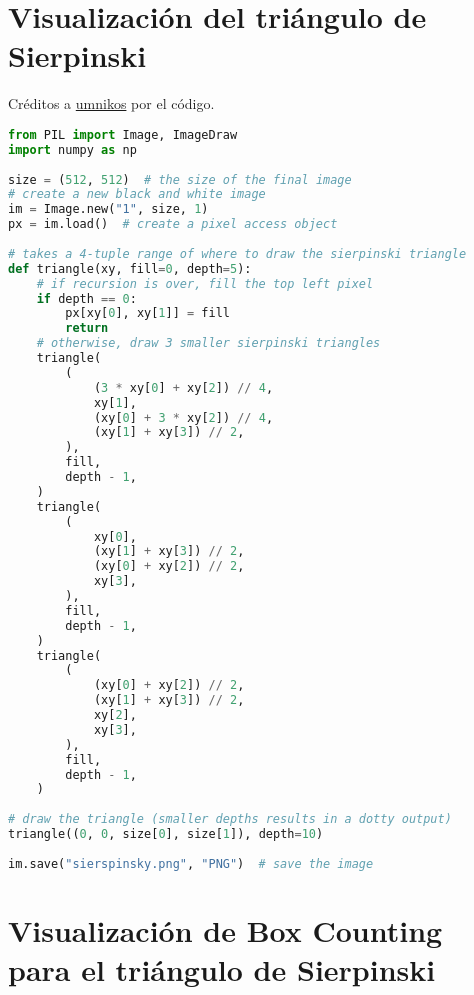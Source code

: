 \section{Visualización del triángulo de Sierpinski}

Créditos a \href{https://github.com/umnikos/Python-Pillow-Library---A-Basic-Example}{umnikos} por el código.

\begin{lstlisting}[language=Python]
from PIL import Image, ImageDraw
import numpy as np
    
size = (512, 512)  # the size of the final image
# create a new black and white image
im = Image.new("1", size, 1)
px = im.load()  # create a pixel access object
    
# takes a 4-tuple range of where to draw the sierpinski triangle
def triangle(xy, fill=0, depth=5):
    # if recursion is over, fill the top left pixel
    if depth == 0:
        px[xy[0], xy[1]] = fill
        return
    # otherwise, draw 3 smaller sierpinski triangles
    triangle(
        (
            (3 * xy[0] + xy[2]) // 4,
            xy[1],
            (xy[0] + 3 * xy[2]) // 4,
            (xy[1] + xy[3]) // 2,
        ),
        fill,
        depth - 1,
    )
    triangle(
        (
            xy[0],
            (xy[1] + xy[3]) // 2,
            (xy[0] + xy[2]) // 2,
            xy[3],
        ),
        fill,
        depth - 1,
    )
    triangle(
        (
            (xy[0] + xy[2]) // 2,
            (xy[1] + xy[3]) // 2,
            xy[2],
            xy[3],
        ),
        fill,
        depth - 1,
    )
    
# draw the triangle (smaller depths results in a dotty output)
triangle((0, 0, size[0], size[1]), depth=10)
            
im.save("sierspinsky.png", "PNG")  # save the image
\end{lstlisting}

\section{Visualización de Box Counting para el triángulo de Sierpinski}

